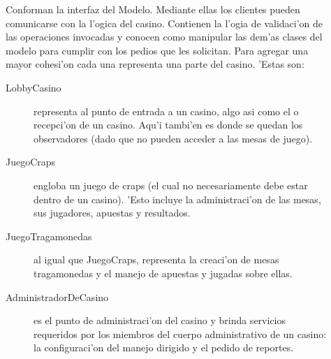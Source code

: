 \begin{description}
\item[] Conforman la interfaz del Modelo. Mediante ellas los clientes pueden comunicarse con la l'ogica del casino. Contienen la l'ogia de validaci'on de las operaciones invocadas y conocen como manipular las dem'as clases del modelo para cumplir con los pedios que les solicitan. Para agregar una mayor cohesi'on cada una representa una parte del casino. 'Estas son:
	\begin{description}
	\item[LobbyCasino] representa al punto de entrada a un casino, algo asi como el  o recepci'on de un casino. Aqu'i tambi'en es donde se quedan los observadores (dado que no pueden acceder a las mesas de juego).
	\item[JuegoCraps] engloba un juego de craps (el cual no necesariamente debe estar dentro de un casino). 'Esto incluye la administraci'on de las mesas, sus jugadores, apuestas y resultados.
	\item[JuegoTragamonedas] al igual que JuegoCraps, representa la creaci'on de mesas tragamonedas y el manejo de apuestas y jugadas sobre ellas.
	\item[AdministradorDeCasino] es el punto de administraci'on del casino y brinda servicios requeridos por los miembros del cuerpo administrativo de un casino: la configuraci'on del manejo dirigido y el pedido de reportes.
	\end{description}


\end{description}
